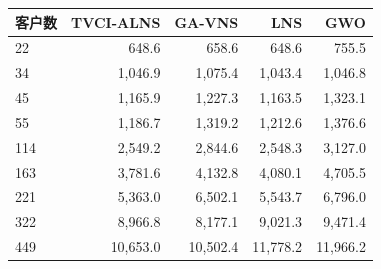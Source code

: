 \begin{tabular*}{0.92\linewidth}{@{\extracolsep{\fill}}lrrrr@{}}
\toprule
客户数 & TVCI-ALNS & GA-VNS & LNS & GWO \\
\midrule
22 & 648.6 & 658.6 & 648.6 & 755.5 \\
34 & 1,046.9 & 1,075.4 & 1,043.4 & 1,046.8 \\
45 & 1,165.9 & 1,227.3 & 1,163.5 & 1,323.1 \\
55 & 1,186.7 & 1,319.2 & 1,212.6 & 1,376.6 \\
114 & 2,549.2 & 2,844.6 & 2,548.3 & 3,127.0 \\
163 & 3,781.6 & 4,132.8 & 4,080.1 & 4,705.5 \\
221 & 5,363.0 & 6,502.1 & 5,543.7 & 6,796.0 \\
322 & 8,966.8 & 8,177.1 & 9,021.3 & 9,471.4 \\
449 & 10,653.0 & 10,502.4 & 11,778.2 & 11,966.2 \\
\bottomrule
\end{tabular*}
